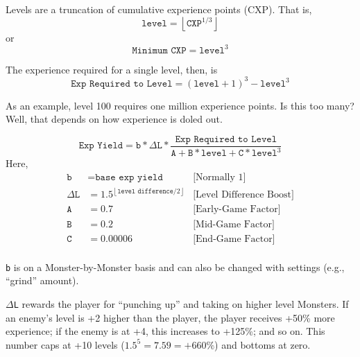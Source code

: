 


Levels are a truncation of cumulative experience points (CXP). That is,
\begin{equation}\label{eqn:level-and-cxp}
	\texttt{level} = \left\lfloor \texttt{CXP}^{1/3} \right\rfloor
\end{equation}
or
\begin{equation}
	\texttt{Minimum CXP} = \texttt{level}^3
\end{equation}

The experience required for a single level, then, is
\begin{equation}
	\texttt{Exp Required to Level} = \left(\texttt{level} + 1\right)^3 - \texttt{level}^3
\end{equation}

As an example, level 100 requires one million experience points. Is this too many? Well, that depends on how experience is doled out.

\begin{equation}
	\texttt{Exp Yield} = \texttt{b} * \Delta\texttt{L} * \frac{\texttt{Exp Required to Level}}{\texttt{A} + \texttt{B}*\texttt{level} + \texttt{C}*\texttt{level}^3}
\end{equation}
Here,
\begin{align*}
	\texttt{b} &= \texttt{base exp yield} 	& \text{[Normally 1]}\\
	\Delta\texttt{L} &= 1.5^{\left\lfloor\texttt{level difference}/2\right\rfloor} & \text{[Level Difference Boost]}\\
	\texttt{A} &= 0.7						& \text{[Early-Game Factor]}\\
	\texttt{B} &= 0.2						& \text{[Mid-Game Factor]}\\
	\texttt{C} &= 0.00006					& \text{[End-Game Factor]}\\
\end{align*}

\texttt{b} is on a Monster-by-Monster basis and can also be changed with settings (e.g., ``grind'' amount). 

$\Delta$\texttt{L} rewards the player for ``punching up'' and taking on higher level Monsters. If an enemy's level is +2 higher than the player, the player receives +50\% more experience; if the enemy is at +4, this increases to +125\%; and so on. This number caps at +10 levels ($1.5^5 = 7.59 = +660\%$) and bottoms at zero.

